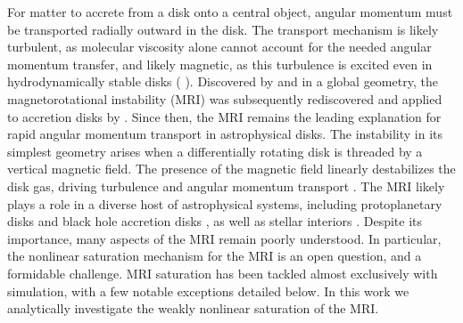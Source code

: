 \documentclass{emulateapj}
\newcommand{\citei}[1]{\citeauthor{#1} \citeyear{#1}}
\begin{document}
For matter to accrete from a disk onto a central object, angular momentum must be transported radially outward in the disk. The transport mechanism is likely turbulent, as molecular viscosity alone cannot account for the needed angular momentum transfer, and likely magnetic, as this turbulence is excited even in hydrodynamically stable disks (\citei{Shakura:1973wg}).  Discovered by \citet{Chandrasekhar:1960wh} and \citet{Velikhov:1959} in a global geometry, the magnetorotational instability (MRI) was subsequently rediscovered and applied to accretion disks by \citet{Balbus:1991vs}. Since then, the MRI remains the leading explanation for rapid angular momentum transport in astrophysical disks. The instability in its simplest geometry arises when a differentially rotating disk is threaded by a vertical magnetic field. The presence of the magnetic field linearly destabilizes the disk gas, driving turbulence and angular momentum transport \citep[e.g.][]{2011ApJ...738...84H,2014MNRAS.438.2513P,2013MNRAS.435.2281P}. The MRI likely plays a role in a diverse host of astrophysical systems, including protoplanetary disks \citep[e.g.][]{2015ApJ...798...84B} and black hole accretion disks \citep[e.g.][]{2013ApJ...769..156S}, as well as stellar interiors \citep[e.g.][]{2015ApJ...799...85W}. Despite its importance, many aspects of the MRI remain poorly understood. In particular, the nonlinear saturation mechanism for the MRI is an open question, and a formidable challenge. MRI saturation has been tackled almost exclusively with simulation, with a few notable exceptions detailed below. In this work we analytically investigate the weakly nonlinear saturation of the MRI.
\end{document}
